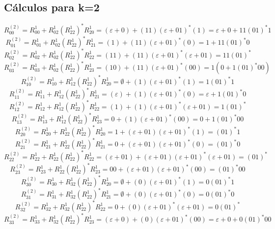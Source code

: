 \documentclass[11pt]{article}
\begin{document}
		\subsection{Cálculos para k=2}
			\[R_{00}^{(2)}=R_{00}^{1}+R_{02}^{1}{(R_{22}^{1})}^\ast R_{20}^{1}=(\varepsilon+0)+(11)(\varepsilon+01)^\ast(1)=\varepsilon+0+11(01)^\ast1\]
			\[R_{01}^{(2)}=R_{01}^{1}+R_{02}^{1}{(R_{22}^{1})}^\ast R_{21}^{1}=(1)+(11)(\varepsilon+01)^\ast(0)=1+11(01)^\ast0\]
			\[R_{02}^{(2)}=R_{02}^{1}+R_{02}^{1}{(R_{22}^{1})}^\ast R_{22}^{1}=(11)+(11)(\varepsilon+01)^\ast(\varepsilon+01)=11(01)^\ast\]
			\[R_{03}^{(2)}=R_{03}^{1}+R_{02}^{1}{(R_{22}^{1})}^\ast R_{23}^{1}=(10)+(11)(\varepsilon+01)^\ast(00)=1(0+1(01)^\ast00)\]
			\[R_{10}^{(2)}=R_{10}^{1}+R_{12}^{1}{(R_{22}^{1})}^\ast R_{20}^{1}=\emptyset+(1)(\varepsilon+01)^\ast(1)=1(01)^\ast1\]
			\[R_{11}^{(2)}=R_{11}^{1}+R_{12}^{1}{(R_{22}^{1})}^\ast R_{21}^{1}=(\varepsilon)+(1)(\varepsilon+01)^\ast(0)=\varepsilon+1(01)^\ast0\]
			\[R_{12}^{(2)}=R_{12}^{1}+R_{12}^{1}{(R_{22}^{1})}^\ast R_{22}^{1}=(1)+(1)(\varepsilon+01)^\ast(\varepsilon+01)=1(01)^\ast\]
			\[R_{13}^{(2)}=R_{13}^{1}+R_{12}^{1}{(R_{22}^{1})}^\ast R_{23}^{1}=0+(1)(\varepsilon+01)^\ast(00)=0+1(01)^\ast00\]
			\[R_{20}^{(2)}=R_{20}^{1}+R_{22}^{1}{(R_{22}^{1})}^\ast R_{20}^{1}=1+(\varepsilon+01)(\varepsilon+01)^\ast(1)=(01)^\ast1\]
			\[R_{21}^{(2)}=R_{21}^{1}+R_{22}^{1}{(R_{22}^{1})}^\ast R_{21}^{1}=0+(\varepsilon+01)(\varepsilon+01)^\ast(0)=(01)^\ast0\]
			\[R_{22}^{(2)}=R_{22}^{1}+R_{22}^{1}{(R_{22}^{1})}^\ast R_{22}^{1}=(\varepsilon+01)+(\varepsilon+01)(\varepsilon+01)^\ast(\varepsilon+01)=(01)^\ast\]
			\[R_{23}^{(2)}=R_{23}^{1}+R_{22}^{1}{(R_{22}^{1})}^\ast R_{23}^{1}=00+(\varepsilon+01)(\varepsilon+01)^\ast(00)=(01)^\ast00\]
			\[R_{30}^{(2)}=R_{30}^{1}+R_{32}^{1}{(R_{22}^{1})}^\ast R_{20}^{1}=\emptyset+(0)(\varepsilon+01)^\ast(1)=0(01)^\ast1\]
			\[R_{31}^{(2)}=R_{31}^{1}+R_{32}^{1}{(R_{22}^{1})}^\ast R_{21}^{1}=\emptyset+(0)(\varepsilon+01)^\ast(0)=0(01)^\ast0\]
			\[R_{32}^{(2)}=R_{32}^{1}+R_{32}^{1}{(R_{22}^{1})}^\ast R_{22}^{1}=0+(0)(\varepsilon+01)^\ast(\varepsilon+01)=0(01)^\ast\]
			\[R_{33}^{(2)}=R_{33}^{1}+R_{32}^{1}{(R_{22}^{1})}^\ast R_{23}^{1}=(\varepsilon+0)+(0)(\varepsilon+01)^\ast(00)=\varepsilon+0+0(01)^\ast00\]
\end{document}
